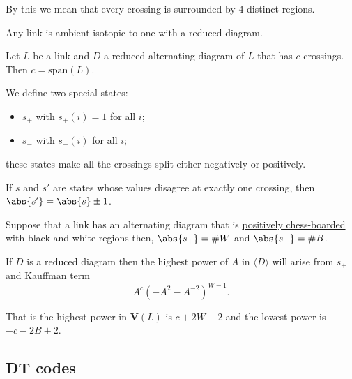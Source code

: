 \documentclass[12pt, a4paper]{article}
\begin{document}
\begin{mdnote}
    By this we mean that every crossing is surrounded by \(4\) distinct regions.
\end{mdnote}

\begin{theorem}
    Any link is ambient isotopic to one with a reduced diagram.
\end{theorem}

\begin{mdprop}
    Let \(L\) be a link and \(D\) a reduced alternating diagram of \(L\) that has \(c\) crossings. Then \(c=\text{span}(L)\).
\end{mdprop}

\begin{definition}
    We define two special states:
    \begin{itemize}
        \item \(s_+\) with \(s_+(i)=1\) for all \(i\);
        \item \(s_-\) with \(s_-(i)\) for all \(i\);
    \end{itemize}
    these states make all the crossings split either negatively or positively.
\end{definition}

\begin{proposition}
    If \(s\) and \(s'\) are states whose values disagree at exactly one crossing, then \(\abs{s'}=\abs{s}\pm 1\).
\end{proposition}

\begin{lemma}
    Suppose that a link has an alternating diagram that is \underline{positively chess-boarded} with black and white regions then, \(\abs{s_{+}}=\#W\) and \(\abs{s_{-}}=\#B\).
\end{lemma}


\begin{mdlemma}
    If \(D\) is a reduced diagram then the highest power of \(A\) in \(\langle D \rangle\) will arise from \(s_+\) and Kauffman term 
    \[A^c (-A^2-A^{-2})^{W-1}.\]
\end{mdlemma}

\begin{mdnote}
    That is the highest power in \(\bm{V}(L)\) is \(c+2W-2\) and the lowest power is \(-c-2B+2\).
\end{mdnote}

\subsection{DT codes}
\end{document}
